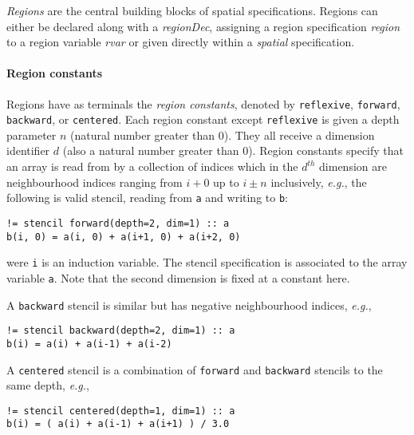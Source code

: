 \documentclass[9pt]{sigplanconf}
\newcounter{block}
\theoremstyle{definition}
\newcommand{\eg}{\emph{e.g.}}
\newcommand{\nonterm}[1]{\textit{#1}}
\newcommand{\term}[1]{\texttt{#1}}
\begin{document}
\emph{Regions} are the central building blocks of spatial
specifications. Regions can either be declared along with a
\nonterm{regionDec}, assigning a region specification \nonterm{region} to
a region variable \nonterm{rvar} or given directly within a
\nonterm{spatial} specification.

\paragraph{Region constants}

Regions have as terminals the \emph{region constants}, denoted by
\term{reflexive}, \term{forward}, \term{backward}, or \term{centered}. Each
region constant except \term{reflexive} is given a depth parameter $n$ (natural
number greater than 0). They all receive a dimension identifier $d$ (also a
natural number greater than 0). Region constants specify that an array is read
from by a collection of indices which in the $d^{th}$ dimension are
neighbourhood indices ranging from $i + 0$ up to $i \pm n$ inclusively,
\eg{}, the following is valid stencil, reading from \term{a} and writing to
\term{b}:
\begin{verbatim}
!= stencil forward(depth=2, dim=1) :: a
b(i, 0) = a(i, 0) + a(i+1, 0) + a(i+2, 0)
\end{verbatim}
were \texttt{i} is an induction variable.  The stencil specification
is associated to the array variable \texttt{a}. Note that the second
dimension is fixed at a constant here.

A \term{backward} stencil
is similar but has negative neighbourhood indices, \eg{},
%
\begin{verbatim}
!= stencil backward(depth=2, dim=1) :: a
b(i) = a(i) + a(i-1) + a(i-2)
\end{verbatim}
%
A \texttt{centered} stencil is a combination of \texttt{forward}
and \texttt{backward} stencils to the same depth, \eg{},
\begin{verbatim}
!= stencil centered(depth=1, dim=1) :: a
b(i) = ( a(i) + a(i-1) + a(i+1) ) / 3.0
\end{verbatim}
\end{document}
